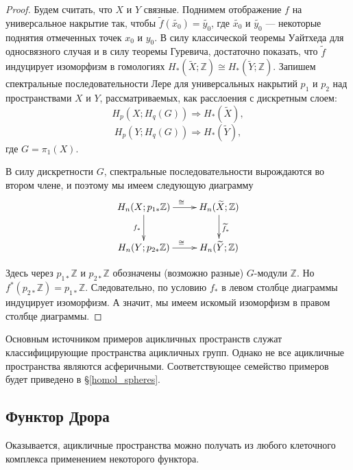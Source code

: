 \documentclass[14pt, dvipsnames, twoside]{extarticle}
\theoremstyle{definition}
\theoremstyle{remark}
\begin{document}
\begin{proof}
Будем считать, что $X$ и $Y$ связные. Поднимем отображение $f$ на универсальное накрытие так, чтобы $\widetilde{f}(\widetilde{x_0}) = \widetilde{y_0}$, где $\widetilde{x_0}$ и $\widetilde{y_0}$ --- некоторые поднятия отмеченных точек $x_0$ и $y_0$. В силу классической теоремы Уайтхеда для односвязного случая и в силу теоремы Гуревича, достаточно показать, что $\widetilde{f}$ индуцирует изоморфизм в гомологиях $H_\ast(\widetilde{X}; \mathbb{Z})\cong H_\ast(\widetilde{Y}; \mathbb{Z})$. Запишем спектральные последовательности Лере для универсальных накрытий $p_1$ и $p_2$ над пространствами $X$ и $Y$, рассматриваемых, как расслоения с дискретным слоем: $$H_p(X; H_q(G))\Rightarrow H_\ast(\widetilde{X}),$$ $$H_p(Y; H_q(G))\Rightarrow H_\ast(\widetilde{Y}),$$ где $G = \pi_1(X)$. 

В силу дискретности $G$, спектральные последовательности вырождаются во втором члене, и поэтому мы имеем следующую диаграмму $$\xymatrix{
    H_n(X; p_{1\ast}\mathbb{Z}) \ar[r]^{\cong} \ar[d]_{f_\ast} & H_n(\widetilde{X}; \mathbb{Z}) \ar[d]^{\widetilde{f}_\ast} \\
    H_n(Y; p_{2\ast}\mathbb{Z}) \ar[r]^{\cong}       & H_n(\widetilde{Y}; \mathbb{Z}) }$$    

Здесь через $p_{1\ast}\mathbb{Z}$ и $p_{2\ast}\mathbb{Z}$ обозначены (возможно разные) $G$-модули $\mathbb{Z}$. Но $f^\ast (p_{2\ast}\mathbb{Z}) = p_{1\ast}\mathbb{Z}$. Следовательно, по условию $f_\ast$ в левом столбце диаграммы индуцирует изоморфизм. А значит, мы имеем искомый изоморфизм в правом столбце диаграммы. 

\end{proof}
 
 Основным источником примеров ацикличных пространств служат классифицирующие пространства ацикличных групп. Однако не все ацикличные пространства являются асферичными. Соответствующее семейство примеров будет приведено в \S\ref{homol_spheres}.
 
 
 
 
 
 
 
 
 
 
 
 
 
 
 \subsection{Функтор Дрора}\label{DrorFunctor}

Оказывается, ацикличные пространства можно получать из любого клеточного комплекса применением некоторого функтора. 
\end{document}
